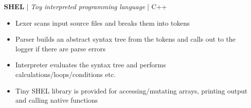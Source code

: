 \item \textbf{SHEL} | \textit{Toy interpreted programming language} | C++
\begin{itemize}
    \item Lexer scans input source files and breaks them into tokens
    \item Parser builds an abstract syntax tree from the tokens and calls out to the logger if there are parse errors
    \item Interpreter evaluates the syntax tree and performs calculations/loops/conditions etc.
    \item Tiny SHEL library is provided for accessing/mutating arrays, printing output and calling native functions
\end{itemize}

